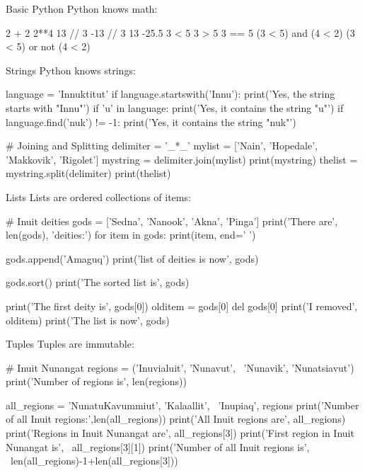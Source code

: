 \documentclass[ignorenonframetext,xcolor=x11names]{beamer}
\begin{document}
\begin{frame}[fragile]{Basic Python}
Python knows math:
\footnotesize
\begin{pythoncode}
2 + 2
2**4
13 // 3
-13 // 3
13 %
-25.5 %
3 < 5
3 > 5
3 == 5
(3 < 5) and (4 < 2)
(3 < 5) or not (4 < 2)
\end{pythoncode}
\end{frame}

\begin{frame}[fragile]{Strings}
Python knows strings:
\footnotesize
\begin{pythoncode}
language = 'Innuktitut'
if language.startswith('Innu'):
    print('Yes, the string starts with "Innu"')
if 'u' in language:
    print('Yes, it contains the string "u"')
if language.find('nuk') != -1:
    print('Yes, it contains the string "nuk"')

# Joining and Splitting    
delimiter = '_*_'
mylist = ['Nain', 'Hopedale', 'Makkovik', 'Rigolet']
mystring = delimiter.join(mylist)
print(mystring)
thelist = mystring.split(delimiter)
print(thelist)
\end{pythoncode}
\end{frame}

\begin{frame}[fragile]{Lists}
Lists are ordered collections of items:
\footnotesize
\begin{pythoncode}
# Inuit deities
gods = ['Sedna', 'Nanook', 'Akna', 'Pinga']
print('There are', len(gods), 'deities:')
for item in gods:
    print(item, end=' ')

gods.append('Amaguq')
print('\nThe list of deities is now', gods)

gods.sort()
print('The sorted list is', gods)

print('The first deity is', gods[0])
olditem = gods[0]
del gods[0]
print('I removed', olditem)
print('The list is now', gods)
\end{pythoncode}
\end{frame}

\begin{frame}[fragile]{Tuples}
Tuples are immutable:
\footnotesize
\begin{pythoncode}
# Inuit Nunangat
regions = ('Inuvialuit', 'Nunavut', \
           'Nunavik', 'Nunatsiavut')
print('Number of regions is', len(regions))

all_regions = 'NunatuKavummiut', 'Kalaallit', \
              'Inupiaq', regions
print('Number of all Inuit regions:',len(all_regions))
print('All Inuit regions are', all_regions)
print('Regions in Inuit Nunangat are', all_regions[3])
print('First region in Inuit Nunangat is', \
      all_regions[3][1])
print('Number of all Inuit regions is', \
      len(all_regions)-1+len(all_regions[3]))
\end{pythoncode}
\end{frame}
\end{document}
